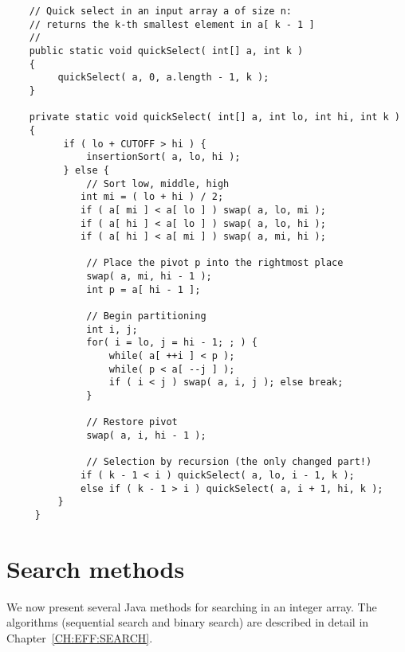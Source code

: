 {\renewcommand{\ttdefault}{pcr} %
\footnotesize 
\begin{verbatim}
    // Quick select in an input array a of size n: 
    // returns the k-th smallest element in a[ k - 1 ]
    //
    public static void quickSelect( int[] a, int k ) 
    { 
         quickSelect( a, 0, a.length - 1, k ); 
    } 
  
    private static void quickSelect( int[] a, int lo, int hi, int k ) 
    {
          if ( lo + CUTOFF > hi ) {
              insertionSort( a, lo, hi ); 
          } else { 
              // Sort low, middle, high
             int mi = ( lo + hi ) / 2; 
             if ( a[ mi ] < a[ lo ] ) swap( a, lo, mi ); 
             if ( a[ hi ] < a[ lo ] ) swap( a, lo, hi ); 
             if ( a[ hi ] < a[ mi ] ) swap( a, mi, hi ); 
 
              // Place the pivot p into the rightmost place 
              swap( a, mi, hi - 1 ); 
              int p = a[ hi - 1 ];

              // Begin partitioning 
              int i, j;
              for( i = lo, j = hi - 1; ; ) { 
                  while( a[ ++i ] < p ); 
                  while( p < a[ --j ] );
                  if ( i < j ) swap( a, i, j ); else break; 
              }  

              // Restore pivot  
              swap( a, i, hi - 1 ); 

              // Selection by recursion (the only changed part!) 
             if ( k - 1 < i ) quickSelect( a, lo, i - 1, k ); 
             else if ( k - 1 > i ) quickSelect( a, i + 1, hi, k ); 
         } 
     }   
\end{verbatim}%
}

\section{Search methods}

We now present several Java methods for searching 
in an integer array. The algorithms (sequential search and 
binary search) are described in detail 
in Chapter~\ref{CH:EFF:SEARCH}.


